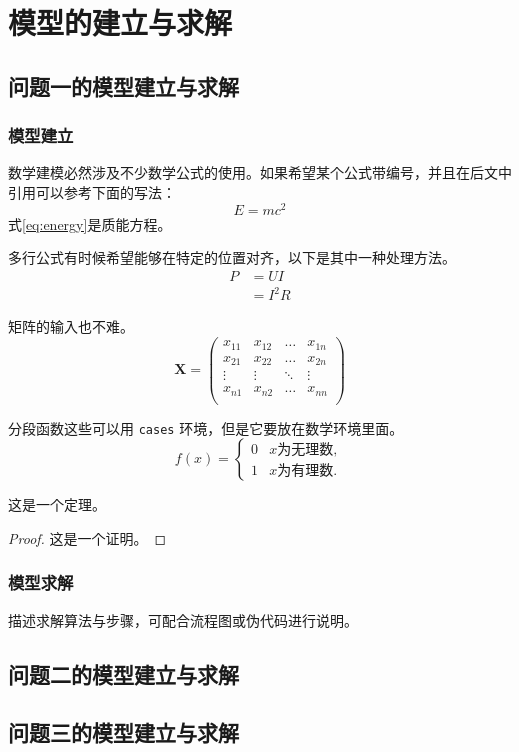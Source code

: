 
\section{模型的建立与求解}

\subsection{问题一的模型建立与求解}

\subsubsection{模型建立}

数学建模必然涉及不少数学公式的使用。如果希望某个公式带编号，并且在后文中引用可以参考下面的写法：
\begin{equation}
	E=mc^2
	\label{eq:energy}
\end{equation}
式\cref{eq:energy}是质能方程。

多行公式有时候希望能够在特定的位置对齐，以下是其中一种处理方法。
\begin{align}
	P & = UI \\
	& = I^2R
\end{align}

矩阵的输入也不难。
\[
\mathbf{X} = \left(
    \begin{array}{cccc}
    x_{11} & x_{12} & \ldots & x_{1n}\\
    x_{21} & x_{22} & \ldots & x_{2n}\\
    \vdots & \vdots & \ddots & \vdots\\
    x_{n1} & x_{n2} & \ldots & x_{nn}\\
    \end{array} \right)
\]

分段函数这些可以用 \verb|cases| 环境，但是它要放在数学环境里面。
\[
f(x) =
    \begin{cases}
        0 &  x \text{为无理数} ,\\
        1 &  x \text{为有理数} .
    \end{cases}
\]

\begin{theorem}
	这是一个定理。
	\label{thm:example}
\end{theorem}

\begin{proof}
	这是一个证明。
\end{proof}

\subsubsection{模型求解}

描述求解算法与步骤，可配合流程图或伪代码进行说明。

\subsection{问题二的模型建立与求解}

\subsection{问题三的模型建立与求解}

